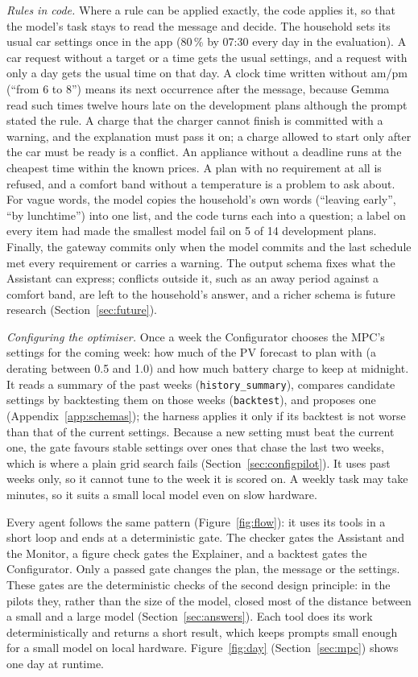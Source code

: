 \documentclass[12pt,a4paper]{report}
\begin{document}
\textit{Rules in code.} Where a rule can be applied exactly, the code
applies it, so that the model's task stays to read the message and
decide. The household sets its usual car settings once in the app
(80\,\% by 07:30 every day in the evaluation). A car request without a
target or a time gets the usual settings, and a request with only a day
gets the usual time on that day. A clock time written without am/pm
(``from 6 to 8'') means its next occurrence after the message, because
Gemma read such times twelve hours late on the development plans
although the prompt stated the rule. A charge that the charger cannot
finish is committed with a warning, and the explanation must pass it
on; a charge allowed to start only after the car must be ready is a
conflict. An appliance without a deadline runs at the cheapest time
within the known prices. A plan with no requirement at all is refused,
and a comfort band without a temperature is a problem to ask about. For
vague words, the model copies the household's own words (``leaving
early'', ``by lunchtime'') into one list, and the code turns each into
a question; a label on every item had made the smallest model fail on 5
of 14 development plans. Finally, the gateway commits only when the
model commits and the last schedule met every requirement or carries a
warning. The output schema fixes what the Assistant can express;
conflicts outside it, such as an away period against a comfort band,
are left to the household's answer, and a richer schema is future
research (Section~\ref{sec:future}).

\textit{Configuring the optimiser.} Once a week the Configurator
chooses the MPC's settings for the coming week: how much of the PV
forecast to plan with (a derating between 0.5 and 1.0) and how much
battery charge to keep at midnight. It reads a summary of the past
weeks (\texttt{history\_summary}), compares candidate settings by
backtesting them on those weeks (\texttt{backtest}), and proposes one
(Appendix~\ref{app:schemas});
the harness applies it only if its backtest is not worse than that of
the current settings. Because a new setting must beat the current one,
the gate favours stable settings over ones that chase the last two
weeks, which is where a plain grid search fails
(Section~\ref{sec:configpilot}). It uses past weeks only, so it
cannot tune to the week it is scored on. A weekly task may take minutes,
so it suits a small local model even on slow hardware.

Every agent follows the same pattern (Figure~\ref{fig:flow}): it uses
its tools in a short loop and ends at a deterministic gate. The checker
gates the Assistant and the Monitor, a figure check gates the Explainer,
and a backtest gates the Configurator. Only a passed gate changes the
plan, the message or the settings. These gates are the deterministic
checks of the second design principle: in the pilots they, rather than
the size of the model, closed most of the distance between a small and
a large model (Section~\ref{sec:answers}). Each tool does its work
deterministically and returns a short result, which keeps prompts small
enough for a small model on local hardware. Figure~\ref{fig:day}
(Section~\ref{sec:mpc}) shows one day at runtime.
\end{document}
